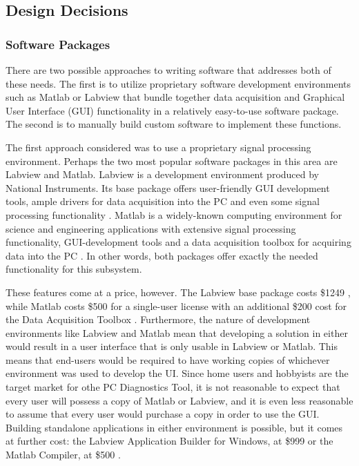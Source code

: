 \subsection[Design Decisions]{Design Decisions}
\subsubsection[Software Packages]{Software Packages}
There are two possible approaches to writing software that addresses both of 
these needs. The first is to utilize proprietary software development 
environments such as Matlab or Labview that bundle together data acquisition 
and Graphical User Interface (GUI) functionality in a relatively easy-to-use 
software package. The second is to manually build custom software to implement 
these functions.

The first approach considered was to use a proprietary signal processing 
environment. Perhaps the two most popular software packages in this area are 
Labview and Matlab. Labview is a development environment produced by National 
Instruments. Its base package offers user-friendly GUI development tools, ample 
drivers for data acquisition into the PC and even some signal processing 
functionality \cite{web:labviewbase}. Matlab is a widely-known computing 
environment for science and engineering applications with extensive signal 
processing functionality, GUI-development tools and a data acquisition toolbox 
for acquiring data into the PC \cite{web:matlab}. In other words, both packages 
offer exactly the needed functionality for this subsystem.

These features come at a price, however. The Labview base package costs 
\$1249 \cite{web:labviewbase}, while Matlab costs \$500 for a single-user license with an 
additional \$200 cost for the Data Acquisition Toolbox \cite{web:matlab}\cite{web:matlabdaq}. 
Furthermore, the nature of development environments like Labview and Matlab mean that 
developing a solution in either would result in a user interface that is only usable in 
Labview or Matlab. This means that end-users would be required to have working 
copies of whichever environment was used to develop the UI. Since home users and 
hobbyists are the target market for othe PC Diagnostics Tool, it is not reasonable 
to expect that every user will possess a copy of Matlab or Labview, and it is even less 
reasonable to assume that every user would purchase a copy in order to use the 
GUI. Building standalone applications in either environment is possible, but it 
comes at further cost: the Labview Application Builder for Windows, at \$999 \cite{web:labviewbase} 
or the Matlab Compiler, at \$500 \cite{web:matlabcompiler}. 

